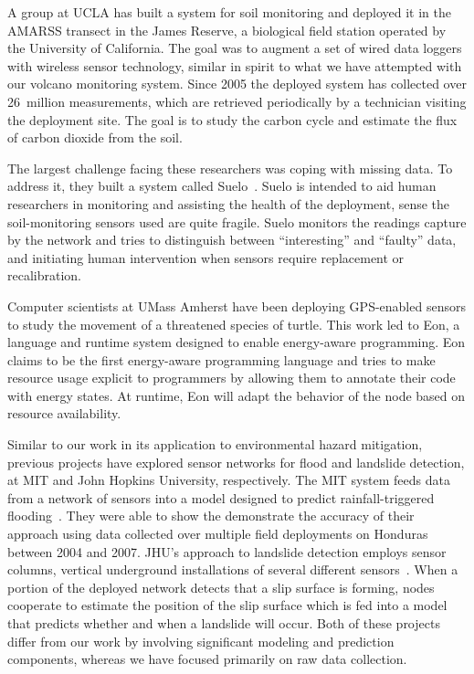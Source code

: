 A group at UCLA has built a system for soil monitoring and deployed it in the
AMARSS transect in the James Reserve, a biological field station operated by
the University of California. The goal was to augment a set of wired data
loggers with wireless sensor technology, similar in spirit to what we have
attempted with our volcano monitoring system. Since 2005 the deployed system
has collected over 26~million measurements, which are retrieved periodically
by a technician visiting the deployment site. The goal is to study the carbon
cycle and estimate the flux of carbon dioxide from the soil.

The largest challenge facing these researchers was coping with missing data.
To address it, they built a system called Suelo~\cite{suelo-sensys09}.  Suelo
is intended to aid human researchers in monitoring and assisting the health
of the deployment, sense the soil-monitoring sensors used are quite fragile.
Suelo monitors the readings capture by the network and tries to distinguish
between ``interesting'' and ``faulty'' data, and initiating human
intervention when sensors require replacement or recalibration.

Computer scientists at UMass Amherst have been deploying GPS-enabled sensors
to study the movement of a threatened species of turtle. This work led to
Eon, a language and runtime system designed to enable energy-aware
programming. Eon claims to be the first energy-aware programming language and
tries to make resource usage explicit to programmers by allowing them to
annotate their code with energy states. At runtime, Eon will adapt the
behavior of the node based on resource availability.

Similar to our work in its application to environmental hazard mitigation,
previous projects have explored sensor networks for flood and landslide
detection, at MIT and John Hopkins University, respectively. The MIT system
feeds data from a network of sensors into a model designed to predict
rainfall-triggered flooding~\cite{basha-sensys08}. They were able to show the
demonstrate the accuracy of their approach using data collected over multiple
field deployments on Honduras between 2004 and 2007. JHU's approach to
landslide detection employs sensor columns, vertical underground
installations of several different sensors~\cite{landslide-sensys05}. When a
portion of the deployed network detects that a slip surface is forming, nodes
cooperate to estimate the position of the slip surface which is fed into a
model that predicts whether and when a landslide will occur. Both of these
projects differ from our work by involving significant modeling and
prediction components, whereas we have focused primarily on raw data
collection.

